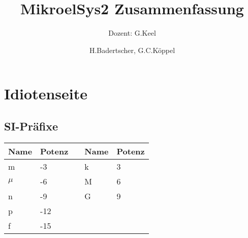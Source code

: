 \documentclass{scrartcl}
\title{MikroelSys2 Zusammenfassung}
\subtitle{Dozent: G.Keel}
\author{H.Badertscher, G.C.Köppel}
\begin{document}

\maketitle






%


\appendix
\section{Idiotenseite}
\subsection{SI-Präfixe}
\begin{tabular}{lllll}
	Name	& Potenz& \qquad	& Name & Potenz \\ \hline
	m 		& -3 	&	& k	& 3	\\
	$\mu$	& -6	&	& M	& 6	\\
	n 		& -9 	&	& G	& 9	\\
	p 		& -12 	&	&		&	\\
	f 		& -15	&	&		&	\\ \hline
\end{tabular}
\end{document}
